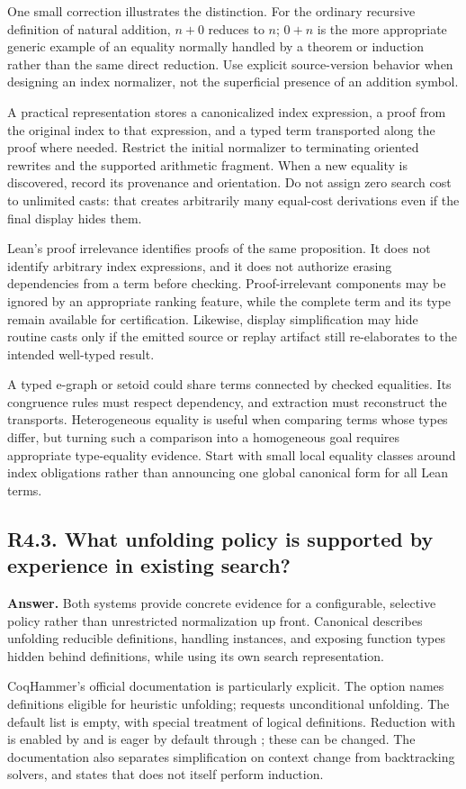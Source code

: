 \documentclass[11pt,a4paper]{article}
\newcommand{\code}[1]{\texttt{\detokenize{#1}}}
\newcommand{\question}[2]{\subsection{#1. #2}\label{q:#1}}
\theoremstyle{definition}
\theoremstyle{remark}
\begin{document}
One small correction illustrates the distinction. For the ordinary recursive definition of natural addition, $n+0$ reduces to $n$; $0+n$ is the more appropriate generic example of an equality normally handled by a theorem or induction rather than the same direct reduction. Use explicit source-version behavior when designing an index normalizer, not the superficial presence of an addition symbol.\cite{lean-nat}

A practical representation stores a canonicalized index expression, a proof from the original index to that expression, and a typed term transported along the proof where needed. Restrict the initial normalizer to terminating oriented rewrites and the supported arithmetic fragment. When a new equality is discovered, record its provenance and orientation. Do not assign zero search cost to unlimited casts: that creates arbitrarily many equal-cost derivations even if the final display hides them.

Lean's proof irrelevance identifies proofs of the same proposition. It does not identify arbitrary index expressions, and it does not authorize erasing dependencies from a term before checking. Proof-irrelevant components may be ignored by an appropriate ranking feature, while the complete term and its type remain available for certification. Likewise, display simplification may hide routine casts only if the emitted source or replay artifact still re-elaborates to the intended well-typed result.

A typed e-graph or setoid could share terms connected by checked equalities. Its congruence rules must respect dependency, and extraction must reconstruct the transports. Heterogeneous equality is useful when comparing terms whose types differ, but turning such a comparison into a homogeneous goal requires appropriate type-equality evidence. Start with small local equality classes around index obligations rather than announcing one global canonical form for all Lean terms.

\question{R4.3}{What unfolding policy is supported by experience in existing search?}

\textbf{Answer.} Both systems provide concrete evidence for a configurable, selective policy rather than unrestricted normalization up front. Canonical describes unfolding reducible definitions, handling instances, and exposing function types hidden behind definitions, while using its own search representation.\cite{canonical}

CoqHammer's official \code{sauto} documentation is particularly explicit. The \code{unfold:} option names definitions eligible for heuristic unfolding; \code{unfold!:} requests unconditional unfolding. The default list is empty, with special treatment of logical definitions. Reduction with \code{simpl} is enabled by \code{red: on} and is eager by default through \code{ered: on}; these can be changed. The documentation also separates simplification on context change from backtracking solvers, and states that \code{sauto} does not itself perform induction.\cite{sauto-docs}
\end{document}
